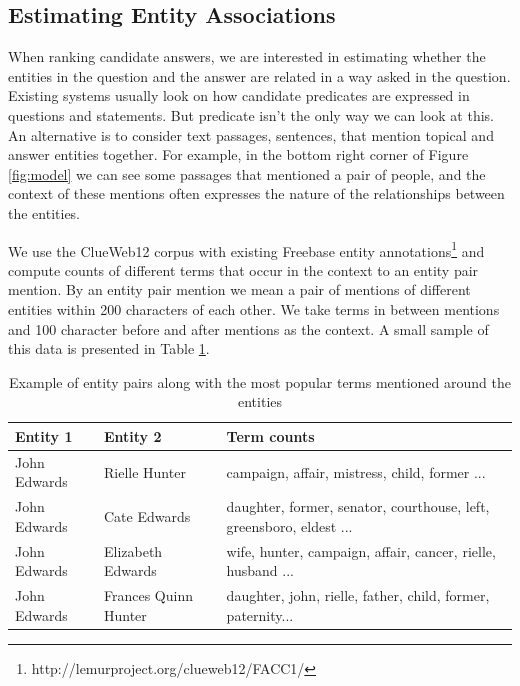 \subsection{Estimating Entity Associations}
\label{section:method:clueweb}

When ranking candidate answers, we are interested in estimating whether the entities in the question and the answer are related in a way asked in the question.
Existing systems usually look on how candidate predicates are expressed in questions and statements.
But predicate isn't the only way we can look at this. An alternative is to consider text passages, \eg sentences, that mention topical and answer entities together.
For example, in the bottom right corner of Figure \ref{fig:model} we can see some passages that mentioned a pair of people, and the context of these mentions often expresses the nature of the relationships between the entities.

We use the ClueWeb12 corpus with existing Freebase entity annotations\footnote{http://lemurproject.org/clueweb12/FACC1/} and compute counts of different terms that occur in the context to an entity pair mention.
By an entity pair mention we mean a pair of mentions of different entities within 200 characters of each other.
We take terms in between mentions and 100 character before and after mentions as the context.
A small sample of this data is presented in Table \ref{table:clueweb_entitypairs_langmodel}.

\begin{table}
\caption{Example of entity pairs along with the most popular terms mentioned around the entities}
\label{table:clueweb_entitypairs_langmodel}
\begin{tabular}{| p{1.25cm} | p{1.23cm} | p{4.5cm} |}
\hline
Entity 1 & Entity 2 & Term counts\\
\hline
John Edwards & Rielle Hunter & campaign, affair, mistress, child, former ...\\
\hline
John Edwards & Cate Edwards & daughter, former, senator, courthouse, left, greensboro, eldest ...\\
\hline
John Edwards & Elizabeth Edwards & wife, hunter, campaign, affair, cancer, rielle, husband ...\\
\hline
John Edwards & Frances Quinn Hunter & daughter, john, rielle, father, child, former, paternity...\\
\hline
\end{tabular}
\end{table}

